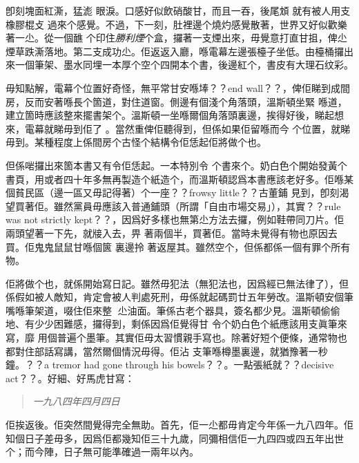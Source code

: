 卽刻塊面紅澌，猛滮
%
眼淚。口感好似飲硝酸甘，而且一吞，後尾䪴
%
就有被人用支橡膠棍攴
%
過來个感覺。不過，下一刻，肚裡邊个燒灼感覺散著，世界又好似歡樂著一尐。從一個䩌
%
个印住\emph{勝利煙}个盒，攞著一支煙出來，毋覺意打直甘抯，俾尐煙草跌澌落地。第二支成功尐。佢返返入廳，喺電幕左邊張檯子坐低。由檯桶攞出來一個筆架、墨水同埋一本厚个空个四開本个書，後邊紅个，書皮有大理石纹彩。

毋知點解，電幕个位置好奇怪，無平常甘安喺埲？？end wall？？，俾佢睇到成間房，反而安著喺長个箇道，對住道窗。側邊有個淺个角落頭，溫斯頓坐緊
%
喺道，建立箇時應該整來擺書架个。溫斯頓一坐喺爾個角落頭裏邊，挨得好後，睇起想來，電幕就睇毋到佢了
%
。當然重俾佢聽得到，但係如果佢留喺而今
%
个位置，就睇毋到。某種程度上係間房个古怪个結構令佢恁起佢將做个也。

但係啱攞出來箇本書又有令佢恁起。一本特別令
%
个書來个。奶白色个開始發黃个書頁，用或者四十年多無再製造个紙造个，而溫斯頓認爲本書應該老好多。佢喺某個貧民區（邊一區又毋記得著）个一座？？frowsy little？？古董鋪
%
見到，卽刻渴望買著佢。雖然黨員毋應該入普通鋪頭（所謂「自由市場交易」），其實？？rule was not strictly kept？？，因爲好多樣也無第尐方法去攞，例如鞋帶同刀片。佢兩頭望著一下先，就𤗈入去，畀
%
著兩個半，買著佢。當時未覺得有物也原因去買。佢鬼鬼鼠鼠甘喺個篋
%
裏邊拎
%
著返屋其。雖然空个，但係都係一個有罪个所有物。

佢將做个也，就係開始寫日記。雖然毋犯法（無犯法也，因爲經已無法律了），但係假如被人敵知，肯定會被人判處死刑，毋係就起碼罰廿五年勞改。溫斯頓安個筆嘴喺筆架道，啜住佢來整𠞉
%
尐油面。筆係古老个器具，簽名都少見。溫斯頓偷偷地、有少少困難感，攞得到，剩係因爲佢覺得甘
%
令个奶白色个紙應該用支眞筆來寫，靡
%
用個普遍个墨筆。其實佢毋太習慣親手寫也。除著好短个便條，通常物也都對住部話寫講，當然爾個情況毋得。佢沾
%
支筆喺樽墨裏邊，就猶豫著一秒鐘。？？a tremor had gone through his bowels？？。一點張紙就？？decisive act？？。好細、好馬虎甘寫：
\begin{quote}\emph{
一九八四年四月四日
}\end{quote}%
佢挨返後。佢突然間覺得完全無助。首先，佢一尐都毋肯定今年係一九八四年。佢知個日子差毋多，因爲佢都幾知佢三十九歲，同彌相信佢一九四四或四五年出世个；而今陣，日子無可能準確過一兩年以內。

